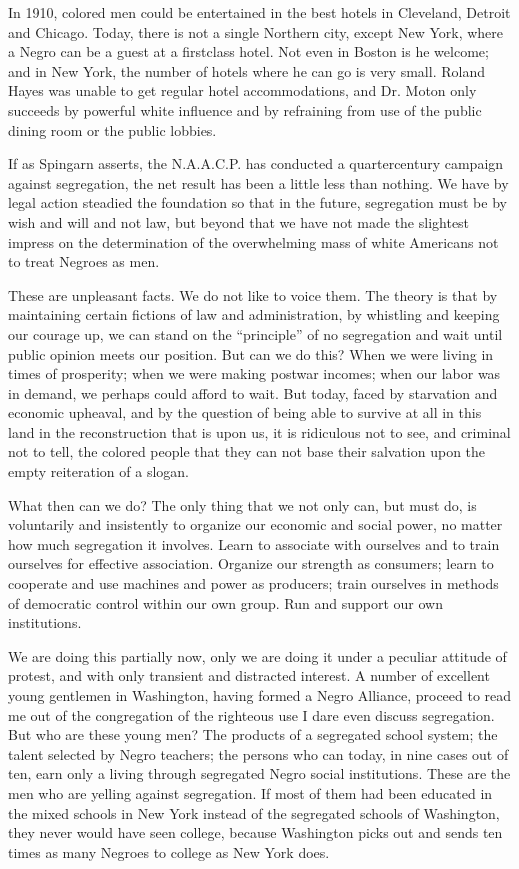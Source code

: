 \documentclass[letterpaper,10pt,english]{jupyterBook}
\begin{document}
\sphinxAtStartPar
In 1910, colored men could be entertained in the best hotels in Cleveland, Detroit and Chicago. Today, there is not a single Northern city, except New York, where a Negro can be a guest at a first\sphinxhyphen{}class hotel. Not even in Boston is he welcome; and in New York, the number of hotels where he can go is very small. Roland Hayes was unable to get regular hotel accommodations, and Dr. Moton only succeeds by powerful white influence and by refraining from use of the public dining room or the public lobbies.

\sphinxAtStartPar
If as Spingarn asserts, the N.A.A.C.P. has conducted a quarter\sphinxhyphen{}century campaign against segregation, the net result has been a little less than nothing. We have by legal action steadied the foundation so that in the future, segregation must be by wish and will and not law, but beyond that we have not made the slightest impress on the determination of the overwhelming mass of white Americans not to treat Negroes as men.

\sphinxAtStartPar
These are unpleasant facts. We do not like to voice them. The theory is that by maintaining certain fictions of law and administration, by whistling and keeping our courage up, we can stand on the “principle” of no segregation and wait until public opinion meets our position. But can we do this? When we were living in times of prosperity; when we were making post\sphinxhyphen{}war incomes; when our labor was in demand, we perhaps could afford to wait. But today, faced by starvation and economic upheaval, and by the question of being able to survive at all in this land in the reconstruction that is upon us, it is ridiculous not to see, and criminal not to tell, the colored people that they can not base their salvation upon the empty reiteration of a slogan.

\sphinxAtStartPar
What then can we do? The only thing that we not only can, but must do, is voluntarily and insistently to organize our economic and social power, no matter how much segregation it involves. Learn to associate with ourselves and to train ourselves for effective association. Organize our strength as consumers; learn to co\sphinxhyphen{}operate and use machines and power as producers; train ourselves in methods of democratic control within our own group. Run and support our own institutions.

\sphinxAtStartPar
We are doing this partially now, only we are doing it under a peculiar attitude of protest, and with only transient and distracted interest. A number of excellent young gentlemen in Washington, having formed a Negro Alliance, proceed to read me out of the congregation of the righteous use I dare even discuss segregation. But who are these young men? The products of a segregated school system; the talent selected by Negro teachers; the persons who can today, in nine cases out of ten, earn only a living through segregated Negro social institutions. These are the men who are yelling against segregation. If most of them had been educated in the mixed schools in New York instead of the segregated schools of Washington, they never would have seen college, because Washington picks out and sends ten times as many Negroes to college as New York does.
\end{document}
